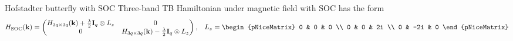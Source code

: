 \documentclass[aspectratio=169,compress,x11names]{beamer}
\begin{document}
	\begin{frame}{Hofstadter butterfly with SOC}
		Three-band TB Hamiltonian under magnetic field with SOC has the form
		\begin{equation}
			\begin{aligned}
				H_{\text{SOC}}(\mathbf{k})
				& =
				\begin{pmatrix}
					H_{3q \times 3q}(\mathbf{k}) + \frac{\lambda}{2} \mathbf{I}_{q} \otimes L_{z} & 0                                                      \\
					0                                                      & H_{3q \times 3q}(\mathbf{k}) - \frac{\lambda}{2} \mathbf{I}_{q} \otimes L_{z}
				\end{pmatrix},
			\end{aligned}
			\begin{aligned}
				L_{z}
				=
				\begin{pNiceMatrix}
					0 & 0   & 0  \\
					0 & 0   & 2i \\
					0 & -2i & 0
				\end{pNiceMatrix}
			\end{aligned}
		\end{equation}
	\end{frame}
\end{document}
